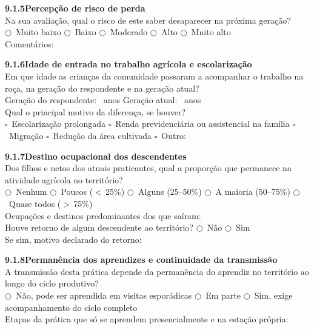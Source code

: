 \medskip\noindent\textbf{9.1.5\quad Percepção de risco de perda}\\[2pt]
Na sua avaliação, qual o risco de este saber desaparecer na próxima geração?\\
$\bigcirc$~Muito baixo \quad $\bigcirc$~Baixo \quad $\bigcirc$~Moderado \quad $\bigcirc$~Alto \quad $\bigcirc$~Muito alto\\[2pt]
Comentários: \dotfill

\medskip\noindent\textbf{9.1.6\quad Idade de entrada no trabalho agrícola e escolarização}\\[2pt]
Em que idade as crianças da comunidade passaram a acompanhar o trabalho na roça, na geração do respondente e na geração atual?\\[2pt]
Geração do respondente: \dotfill\ anos \qquad Geração atual: \dotfill\ anos\\[2pt]
Qual o principal motivo da diferença, se houver?\\
$\square$~Escolarização prolongada \quad $\square$~Renda previdenciária ou assistencial na família \quad $\square$~Migração \quad $\square$~Redução da área cultivada \quad $\square$~Outro: \dotfill

\medskip\noindent\textbf{9.1.7\quad Destino ocupacional dos descendentes}\\[2pt]
Dos filhos e netos dos atuais praticantes, qual a proporção que permanece na atividade agrícola no território?\\
$\bigcirc$~Nenhum \quad $\bigcirc$~Poucos ($<$\,25\%) \quad $\bigcirc$~Alguns (25--50\%) \quad $\bigcirc$~A maioria (50--75\%) \quad $\bigcirc$~Quase todos ($>$\,75\%)\\[2pt]
Ocupações e destinos predominantes dos que saíram: \dotfill\\[2pt]
Houve retorno de algum descendente ao território? \quad $\bigcirc$~Não \quad $\bigcirc$~Sim\\[2pt]
Se sim, motivo declarado do retorno: \dotfill

\medskip\noindent\textbf{9.1.8\quad Permanência dos aprendizes e continuidade da transmissão}\\[2pt]
A transmissão desta prática depende da permanência do aprendiz no território ao longo do ciclo produtivo?\\
$\bigcirc$~Não, pode ser aprendida em visitas esporádicas \quad $\bigcirc$~Em parte \quad $\bigcirc$~Sim, exige acompanhamento do ciclo completo\\[2pt]
Etapas da prática que só se aprendem presencialmente e na estação própria: \dotfill

